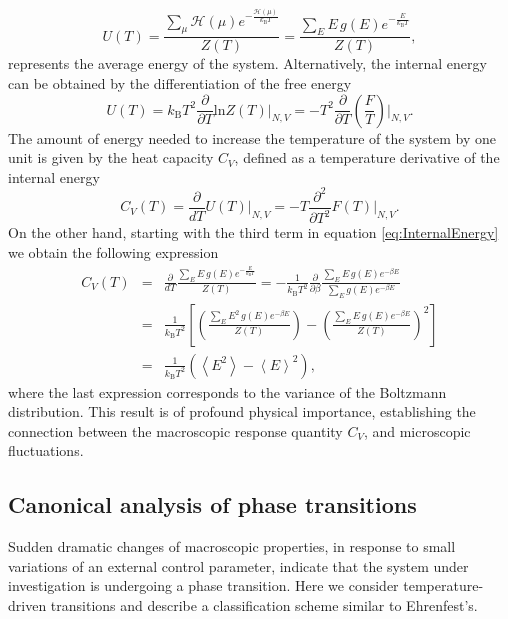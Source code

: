 \documentclass[12pt]{report}
\begin{document}
\begin{equation}
\label{eq:InternalEnergy}
U(T) = \frac{\sum_{\mu} \mathcal{H}(\mu)e^{-\frac{\mathcal{H}(\mu)}{k_{\mathrm{B}}T}}}{Z(T)} =  \frac{\sum_{E} E \, g(E) e^{-\frac{E}{k_{\mathrm{B}}T}}}{Z(T)},
\end{equation}
represents the average energy of the system. Alternatively, the internal energy can be obtained by the differentiation of the free energy
\begin{equation}
U(T) = k_{\mathrm{B}}T^{2}\frac{\partial}{\partial T} \mathrm{ln} Z(T)\bigg|_{N,V}
= -T^{2}\frac{\partial}{\partial T}\left(\frac{F}{T}\right)\bigg|_{N,V}.
\end{equation}
\newpage
\noindent
The amount of energy needed to increase the temperature of the system by one unit is given by the heat capacity 
$C_{V}$, defined as a temperature derivative of the internal energy
\begin{equation}\label{eq:22}
C_{V}(T) = \frac{\partial}{dT}U(T)\bigg|_{N,V} = -T\frac{\partial^{2}}{\partial T^{2}}F(T)\bigg|_{N,V}.
\end{equation}
On the other hand, starting with the third term in equation \ref{eq:InternalEnergy} we obtain the following expression 
\begin{eqnarray}
C_{V}(T) &=&  \frac{\partial}{dT}\frac{\sum_{E} E \, g(E) e^{-\frac{E}{k_{\mathrm{B}}T}}}{Z(T)} = -\frac{1}{k_{\mathrm{B}}T^2}\frac{\partial}{\partial \beta}\frac{\sum_{E} E \, g(E) e^{-\beta E}}{\sum_{E}g(E) e^{-\beta E}} \nonumber \\
&=& \frac{1}{k_{\mathrm{B}}T^2} \left[\left(\frac{\sum_{E} E^{2} \, g(E)  e^{-\beta E}}{Z(T)}\right) - \left(\frac{\sum_{E} E \, g(E)  e^{-\beta E}}{Z(T)}\right)^{2}\right] \nonumber \\
&=& \frac{1}{k_{\mathrm{B}}T^2}\left(\left<E^{2}\right> - \left<E\right>^{2}\right),
\end{eqnarray}
where the last expression corresponds to the variance of the Boltzmann distribution. This result is of profound physical importance, establishing the connection between the macroscopic response quantity $C_{V}$, and microscopic fluctuations.

\subsection{Canonical analysis of phase transitions}
Sudden dramatic changes of macroscopic properties, in response to small variations of an external control parameter, indicate that the system under investigation is undergoing a phase transition. Here we consider temperature-driven transitions and describe a classification scheme similar to Ehrenfest's.
\end{document}
